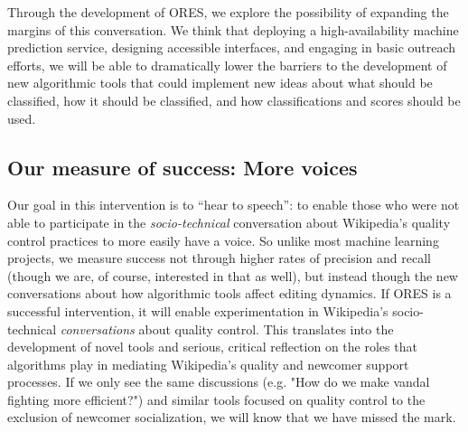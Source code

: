 Through the development of ORES, we explore the possibility of expanding the margins of this conversation\cite{mugar2017preserving}.  We think that deploying a high-availability machine prediction service, designing accessible interfaces, and engaging in basic outreach efforts, we will be able to dramatically lower the barriers to the development of new algorithmic tools that could implement new ideas about what should be classified, how it should be classified, and how classifications and scores should be used.  

\subsection{Our measure of success: More voices}
Our goal in this intervention is to ``hear to speech'': to enable those who were not able to participate in the \emph{socio-technical} conversation about Wikipedia's quality control practices to more easily have a voice.  So unlike most machine learning projects, we measure success not through higher rates of precision and recall (though we are, of course, interested in that as well), but instead though the new conversations about how algorithmic tools affect editing dynamics.  If ORES is a successful intervention, it will enable experimentation in Wikipedia's socio-technical \emph{conversations} about quality control.  This translates into the development of novel tools and serious, critical reflection on the roles that algorithms play in mediating Wikipedia's quality and newcomer support processes. If we only see the same discussions (e.g. "How do we make vandal fighting more efficient?") and similar tools focused on quality control to the exclusion of newcomer socialization, we will know that we have missed the mark.